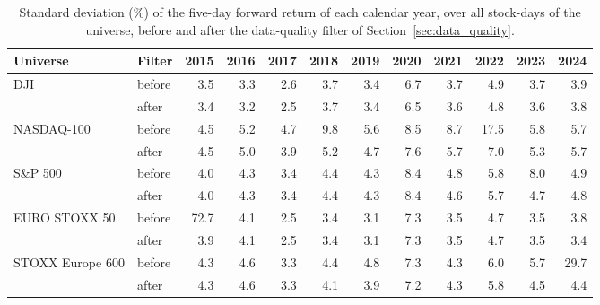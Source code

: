 \begin{table}[htbp]
\centering
\small
\begin{adjustbox}{max width=\textwidth}
\begin{tabular}{@{}llrrrrrrrrrr@{}}
\toprule
\textbf{Universe} & \textbf{Filter} & \textbf{2015} & \textbf{2016} & \textbf{2017} & \textbf{2018} & \textbf{2019} & \textbf{2020} & \textbf{2021} & \textbf{2022} & \textbf{2023} & \textbf{2024} \\
\midrule
\multirow{2}{*}{DJI} & before & 3.5 & 3.3 & 2.6 & 3.7 & 3.4 & 6.7 & 3.7 & 4.9 & 3.7 & 3.9 \\
 & after & 3.4 & 3.2 & 2.5 & 3.7 & 3.4 & 6.5 & 3.6 & 4.8 & 3.6 & 3.8 \\
\midrule
\multirow{2}{*}{NASDAQ-100} & before & 4.5 & 5.2 & 4.7 & 9.8 & 5.6 & 8.5 & 8.7 & 17.5 & 5.8 & 5.7 \\
 & after & 4.5 & 5.0 & 3.9 & 5.2 & 4.7 & 7.6 & 5.7 & 7.0 & 5.3 & 5.7 \\
\midrule
\multirow{2}{*}{S\&P 500} & before & 4.0 & 4.3 & 3.4 & 4.4 & 4.3 & 8.4 & 4.8 & 5.8 & 8.0 & 4.9 \\
 & after & 4.0 & 4.3 & 3.4 & 4.4 & 4.3 & 8.4 & 4.6 & 5.7 & 4.7 & 4.8 \\
\midrule
\multirow{2}{*}{EURO STOXX 50} & before & 72.7 & 4.1 & 2.5 & 3.4 & 3.1 & 7.3 & 3.5 & 4.7 & 3.5 & 3.8 \\
 & after & 3.9 & 4.1 & 2.5 & 3.4 & 3.1 & 7.3 & 3.5 & 4.7 & 3.5 & 3.4 \\
\midrule
\multirow{2}{*}{STOXX Europe 600} & before & 4.3 & 4.6 & 3.3 & 4.4 & 4.8 & 7.3 & 4.3 & 6.0 & 5.7 & 29.7 \\
 & after & 4.3 & 4.6 & 3.3 & 4.1 & 3.9 & 7.2 & 4.3 & 5.8 & 4.5 & 4.4 \\
\bottomrule
\end{tabular}
\end{adjustbox}
\caption{Standard deviation (\%) of the five-day forward return of each calendar year, over all stock-days of the universe, before and after the data-quality filter of Section~\ref{sec:data_quality}.}
\label{tab:data_label_std}
\end{table}
